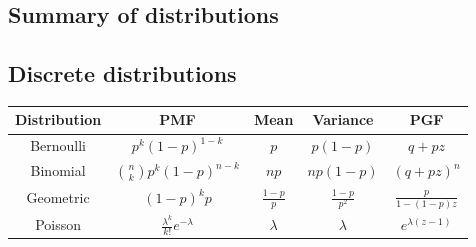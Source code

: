 \documentclass[a4paper]{article}
\begin{document}
\ifx \nhtml \undefined
\begin{landscape}
\section{Summary of distributions}
\subsection{Discrete distributions}
\begin{center}
  \begin{tabular}{ccccc}
    \toprule
    \textbf{Distribution} & \textbf{PMF} & \textbf{Mean} & \textbf{Variance} & \textbf{PGF} \\
    \midrule
    Bernoulli & $p^k(1 - p)^{1 - k}$ & $p$ & $p(1 - p)$ & $q + pz$\\
    Binomial & $\displaystyle\binom{n}{k}p^k(1 - p)^{n - k}$ & $np$ & $np(1 - p)$ & $(q + pz)^n$\\
    Geometric & $(1 - p)^k p$ & $\displaystyle\frac{1 - p}{p}$ & $\displaystyle\frac{1 - p}{p^2}$ & $\displaystyle\frac{p}{1 - (1-p)z}$\\
    Poisson & $\displaystyle\frac{\lambda^k}{k!}e^{-\lambda}$ & $\lambda$ & $\lambda$ & $e^{\lambda(z - 1)}$\\
    \bottomrule
  \end{tabular}
\end{center}

\end{landscape}
\end{document}
